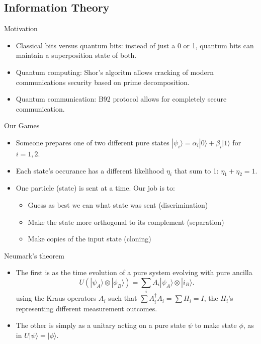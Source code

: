 \documentclass{beamer}
\newcommand{\ke}[1]{|#1\rangle}
\begin{document}
\subsection{Information Theory}
\begin{frame}{Motivation}
\begin{itemize}
\item
Classical bits versus quantum bits: instead of just a 0 or 1, quantum bits can maintain a superposition state of both.
\pause
\item
Quantum computing: Shor's algoritm allows cracking of modern communications security based on prime decomposition.
\pause
\item
Quantum communication: B92 protocol allows for completely secure communication.
\end{itemize}
\end{frame}
\begin{frame}{Our Games}
\begin{itemize}
\item
Someone prepares one of two different pure states $\ke {\psi_i} = \alpha_i \ke 0 +  \beta_i \ke 1$
for $i = 1,2$.
\pause
\item
Each state's occurance has a different likelihood $\eta_i$ that sum to 1: $\eta_1+\eta_2 =1$.
\pause
\item
One particle (state) is sent at a time.  Our job is to:
\begin{itemize}
\item
 Guess as best we can what state was sent (discrimination)
\item Make the state more orthogonal to its complement (separation)
\item
Make copies of the input state (cloning)

\end{itemize}

\end{itemize}

\end{frame}

\begin{frame}{Neumark's theorem}
\begin{itemize}
\item
The first is as the time evolution of a pure system evolving with pure ancilla
\[U(\ke {\psi_A} \otimes \ke {\phi_B}) = \sum_i A_i \ke {\psi_A} \otimes \ke {i_B}.\]
using the  Kraus operators $A_i$ such that $\sum A^\dagger_i A_i = \sum \Pi_i = I$,
the $\Pi_i$'s representing different measurement outcomes.

\item
The other is simply as a unitary acting on a pure state $\psi$ to make state $\phi$, as in $U\ke \psi = \ke \phi$.
\end{itemize}
\end{frame}
\end{document}
